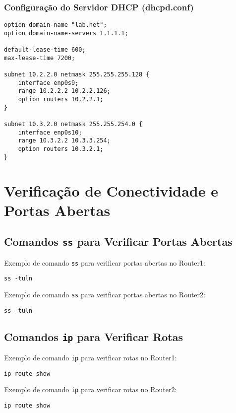 \documentclass{article}
\begin{document}
\subsubsection{Configuração do Servidor DHCP (dhcpd.conf)}
\begin{verbatim}
option domain-name "lab.net";
option domain-name-servers 1.1.1.1;

default-lease-time 600;
max-lease-time 7200;

subnet 10.2.2.0 netmask 255.255.255.128 {
    interface enp0s9;
    range 10.2.2.2 10.2.2.126;
    option routers 10.2.2.1;
}

subnet 10.3.2.0 netmask 255.255.254.0 {
    interface enp0s10;
    range 10.3.2.2 10.3.3.254;
    option routers 10.3.2.1;
}
\end{verbatim}

\section{Verificação de Conectividade e Portas Abertas}

\subsection{Comandos \texttt{ss} para Verificar Portas Abertas}
Exemplo de comando \texttt{ss} para verificar portas abertas no Router1:
\begin{verbatim}
ss -tuln
\end{verbatim}

Exemplo de comando \texttt{ss} para verificar portas abertas no Router2:
\begin{verbatim}
ss -tuln
\end{verbatim}

\subsection{Comandos \texttt{ip} para Verificar Rotas}
Exemplo de comando \texttt{ip} para verificar rotas no Router1:
\begin{verbatim}
ip route show
\end{verbatim}

Exemplo de comando \texttt{ip} para verificar rotas no Router2:
\begin{verbatim}
ip route show
\end{verbatim}
\end{document}
